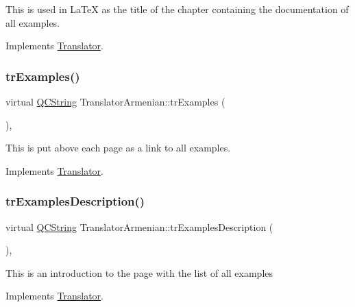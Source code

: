 This is used in La\+TeX as the title of the chapter containing the documentation of all examples. 

Implements \mbox{\hyperlink{class_translator}{Translator}}.

\mbox{\label{class_translator_armenian_a7c5c8f4e0ebf08f9e67d15891e43fbb4}} 
\subsubsection{\texorpdfstring{trExamples()}{trExamples()}}
{\footnotesize\ttfamily virtual \mbox{\hyperlink{class_q_c_string}{Q\+C\+String}} Translator\+Armenian\+::tr\+Examples (\begin{DoxyParamCaption}{ }\end{DoxyParamCaption})\hspace{0.3cm}{\ttfamily [inline]}, {\ttfamily [virtual]}}

This is put above each page as a link to all examples. 

Implements \mbox{\hyperlink{class_translator}{Translator}}.

\mbox{\label{class_translator_armenian_a7fffcf5bcff1b4f49c267a497cd9739b}} 
\subsubsection{\texorpdfstring{trExamplesDescription()}{trExamplesDescription()}}
{\footnotesize\ttfamily virtual \mbox{\hyperlink{class_q_c_string}{Q\+C\+String}} Translator\+Armenian\+::tr\+Examples\+Description (\begin{DoxyParamCaption}{ }\end{DoxyParamCaption})\hspace{0.3cm}{\ttfamily [inline]}, {\ttfamily [virtual]}}

This is an introduction to the page with the list of all examples 

Implements \mbox{\hyperlink{class_translator}{Translator}}.

\mbox{\label{class_translator_armenian_af5156692116d005bf5aab19770206609}} 
